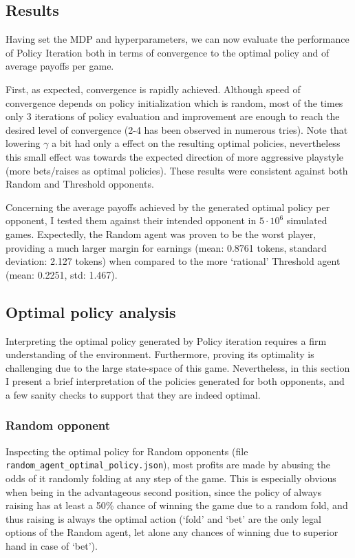 \subsection{Results}

Having set the MDP and hyperparameters, we can now evaluate the performance of Policy Iteration both in terms of convergence to the optimal policy and of average payoffs per game.

First, as expected, convergence is rapidly achieved. Although speed of convergence depends on policy initialization which is random, most of the times only 3 iterations of policy evaluation and improvement are enough to reach the desired level of convergence (2-4 has been observed in numerous tries). Note that lowering $\gamma$ a bit had only a effect on the resulting optimal policies, nevertheless this small effect was towards the expected direction of more aggressive playstyle (more bets/raises as optimal policies). These results were consistent against both Random and Threshold opponents.

Concerning the average payoffs achieved by the generated optimal policy per opponent, I tested them against their intended opponent in $5\cdot10^6$ simulated games. Expectedly, the Random agent was proven to be the worst player, providing a much larger margin for earnings (mean: 0.8761 tokens, standard deviation: 2.127 tokens) when compared to the more `rational' Threshold agent (mean: 0.2251, std: 1.467). 

\subsection{Optimal policy analysis}

Interpreting the optimal policy generated by Policy iteration requires a firm understanding of the environment. Furthermore, proving its optimality is challenging due to the large state-space of this game. Nevertheless, in this section I present a brief interpretation of the policies generated for both opponents, and a few sanity checks to support that they are indeed optimal.

\subsubsection{Random opponent}

Inspecting the optimal policy for Random opponents (file \Verb|random_agent_optimal_policy.json|), most profits are made by abusing the odds of it randomly folding at any step of the game. This is especially obvious when being in the advantageous second position, since the policy of always raising has at least a 50\% chance of winning the game due to a random fold, and thus raising is always the optimal action (`fold' and `bet' are the only legal options of the Random agent, let alone any chances of winning due to superior hand in case of `bet').

